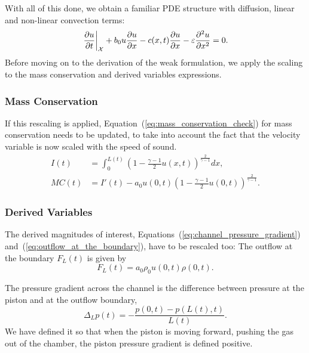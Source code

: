 \documentclass[../../thesis.tex]{subfiles}
\newcommand{\aleX}{\ensuremath{\mathcal{X}}}
\begin{document}
With all of this done, we obtain a familiar PDE structure with diffusion, linear and non-linear convection terms:
\begin{equation}
    \left.\frac{\partial u}{\partial t}\right|_{\aleX} 
    + b_0 u \frac{\partial u}{\partial x} 
    - c(x,t)\frac{\partial u}{\partial x} 
    - \varepsilon  \pdv[2]{u}{x} = 0.
\end{equation}
Before moving on to the derivation of the weak formulation, we apply the scaling to the mass conservation and derived variables expressions.

\subsubsection{Mass Conservation}
If this rescaling is applied, Equation~(\ref{eq:mass_conservation_check}) for mass conservation needs to be updated, 
to take into account the fact that the velocity variable is now scaled with the speed of sound.
\begin{subequations}
    \begin{align}
        I(t) &= \int_{0}^{L(t)} \left(1 - \frac{\gamma-1}{2}u(x,t)\right)^{\frac{2}{\gamma-1}} dx, 
        \\
        MC(t) &= I'(t) - a_0 u(0,t) \left(1 - \frac{\gamma-1}{2}u(0,t)\right)^{\frac{2}{\gamma-1}}.
    \end{align}    
\end{subequations}

\subsubsection{Derived Variables}
The derived magnitudes of interest, Equations~(\ref{eq:channel_pressure_gradient}) and~(\ref{eq:outflow_at_the_boundary}), have to be rescaled too:
The outflow at the boundary $F_L(t)$ is given by
\begin{equation}
    F_L(t) = a_0 \rho_0 u(0,t) \rho(0,t).
\end{equation}

The pressure gradient across the channel is the difference between pressure at the piston and at the outflow boundary,
\begin{equation}
    \Delta_L p(t) = - \frac{p(0,t) - p(L(t),t)}{L(t)}. 
\end{equation}
We have defined it so that when the piston is moving forward, pushing the gas out of the chamber, the piston pressure gradient is defined positive.
\end{document}

